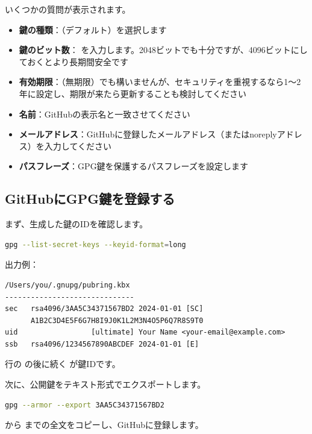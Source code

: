 いくつかの質問が表示されます。

\begin{itemize}
  \item \textbf{鍵の種類}：（デフォルト）を選択します
  \item \textbf{鍵のビット数}： を入力します。2048ビットでも十分ですが、4096ビットにしておくとより長期間安全です
  \item \textbf{有効期限}：（無期限）でも構いませんが、セキュリティを重視するなら1〜2年に設定し、期限が来たら更新することも検討してください
  \item \textbf{名前}：GitHubの表示名と一致させてください
  \item \textbf{メールアドレス}：GitHubに登録したメールアドレス（またはnoreplyアドレス）を入力してください
  \item \textbf{パスフレーズ}：GPG鍵を保護するパスフレーズを設定します
\end{itemize}

\subsection{GitHubにGPG鍵を登録する}

まず、生成した鍵のIDを確認します。

\begin{lstlisting}[language=bash]
gpg --list-secret-keys --keyid-format=long
\end{lstlisting}

出力例：

\begin{lstlisting}[language={}]
/Users/you/.gnupg/pubring.kbx
------------------------------
sec   rsa4096/3AA5C34371567BD2 2024-01-01 [SC]
      A1B2C3D4E5F6G7H8I9J0K1L2M3N4O5P6Q7R8S9T0
uid                 [ultimate] Your Name <your-email@example.com>
ssb   rsa4096/1234567890ABCDEF 2024-01-01 [E]
\end{lstlisting}

 行の  の後に続く  が鍵IDです。

次に、公開鍵をテキスト形式でエクスポートします。

\begin{lstlisting}[language=bash]
gpg --armor --export 3AA5C34371567BD2
\end{lstlisting}

 から  までの全文をコピーし、GitHubに登録します。

